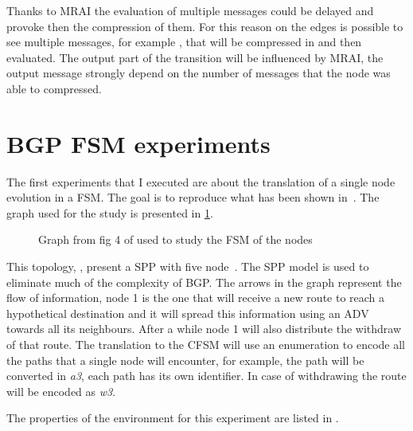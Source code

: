 Thanks to \ac{MRAI} the evaluation of multiple messages could be delayed and
provoke then the compression of them.
For this reason on the edges is possible to see multiple messages, for example
\q{[A1W1A1]}, that will be compressed in \q{[A1]} and then evaluated.
The output part of the transition will be influenced by \ac{MRAI}, the output
message strongly depend on the number of messages that the node was able
to compressed.


\section{BGP FSM experiments}
\label{sec:bgp_fsm_experiments}

The first experiments that I executed are about the translation of a single
node evolution in a \ac{FSM}.
The goal is to reproduce what has been shown in~\cite{griffinFSM}.
The graph used for the study is presented in \cref{fig:griffin_fig_4}.

\begin{figure}[h]
    \begin{center}
        
    \end{center}
	\caption{Graph from fig 4 of \cite{griffinFSM} used to study the \ac{FSM}
		of the nodes}
    \label{fig:griffin_fig_4}
\end{figure}

This topology, , present a \ac{SPP} with five node~\cite{griffin2002stable}.
The \ac{SPP} model is used to eliminate much of the complexity of \ac{BGP}.
The arrows in the graph represent the flow of information, node \num{1} is the one
that will receive a new route to reach a hypothetical destination and it will
spread this information using an \ac{ADV} towards all its neighbours.
After a while node \num{1} will also distribute the withdraw of that route.
The translation to the \ac{CFSM} will use an enumeration to encode all the
paths that a single node will encounter, for example, the path  will
be converted in \textit{a3}, each path has its own identifier.
In case of withdrawing the route will be encoded as \textit{w3}.

The properties of the environment for this experiment are listed in .

